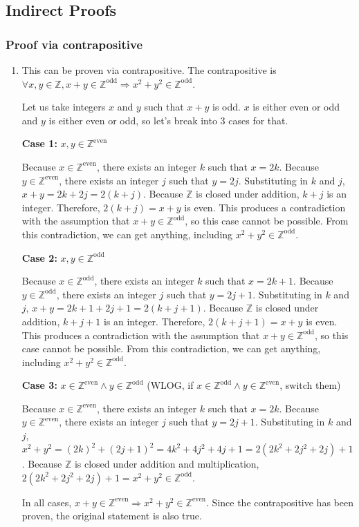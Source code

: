 \documentclass[12pt, leqno]{article}
\newcommand{\Z}{\mathbb{Z}}
\newcommand{\evens}{\mathbb{Z}^{\mathrm{even}}}
\newcommand{\odds}{\mathbb{Z}^{\mathrm{odd}}}
\begin{document}
\subsection{Indirect Proofs}

\subsubsection{Proof via contrapositive}

\begin{enumerate}
    \item This can be proven via contrapositive. The contrapositive is $\forall x, y \in \Z, x + y \in \Z^{\mathrm{odd}} \Rightarrow x^2 + y^2 \in \Z^{\mathrm{odd}}$.
    
    Let us take integers $x$ and $y$ such that $x + y$ is odd. $x$ is either even or odd and $y$ is either even or odd, so let's break into 3 cases for that.
    
    \textbf{Case 1:} $x, y \in \evens$
    
    Because $x \in \evens$, there exists an integer $k$ such that $x = 2k$. Because $y \in \evens$, there exists an integer $j$ such that $y = 2j$. Substituting in $k$ and $j$, $x + y = 2k + 2j = 2(k + j)$. Because $\Z$ is closed under addition, $k + j$ is an integer. Therefore, $2(k + j) = x + y$ is even. This produces a contradiction with the assumption that $x + y \in \odds$, so this case cannot be possible. From this contradiction, we can get anything, including $x^2 + y^2 \in \odds$.

    \textbf{Case 2:} $x, y \in \odds$
    
    Because $x \in \odds$, there exists an integer $k$ such that $x = 2k + 1$. Because $y \in \odds$, there exists an integer $j$ such that $y = 2j + 1$. Substituting in $k$ and $j$, $x + y = 2k + 1 + 2j + 1 = 2(k + j + 1)$. Because $\Z$ is closed under addition, $k + j + 1$ is an integer. Therefore, $2(k + j + 1) = x + y$ is even. This produces a contradiction with the assumption that $x + y \in \odds$, so this case cannot be possible. From this contradiction, we can get anything, including $x^2 + y^2 \in \odds$.
    
    \textbf{Case 3:} $x \in \evens \land y \in \odds$ (WLOG, if $x \in \odds \land y \in \evens$, switch them)
    
    Because $x \in \evens$, there exists an integer $k$ such that $x = 2k$. Because $y \in \evens$, there exists an integer $j$ such that $y = 2j + 1$. Substituting in $k$ and $j$, $x^2 + y^2 = (2k)^2 + (2j + 1)^2 = 4k^2 + 4j^2 + 4j + 1 = 2(2k^2 + 2j^2 + 2j) + 1$. Because $\Z$ is closed under addition and multiplication, $2(2k^2 + 2j^2 + 2j) + 1 = x^2 + y^2 \in \odds$.
    
    In all cases, $x + y \in \evens \Rightarrow x^2 + y^2 \in \evens$. Since the contrapositive has been proven, the original statement is also true.
\end{enumerate}
\end{document}
